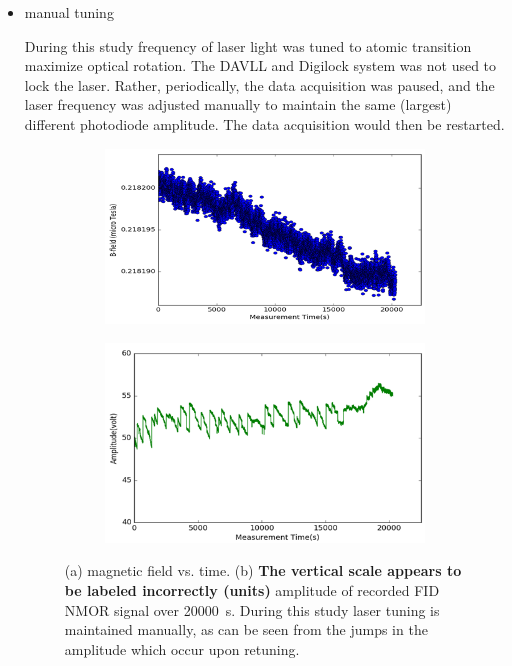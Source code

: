 \begin{itemize}
  {\bf If there is any other data that would substantiate your
    statements, please present it.}
  
\item manual tuning

During this study frequency of laser light was tuned to atomic
transition maximize optical rotation. The DAVLL and Digilock system
was not used to lock the laser.  Rather, periodically, the data
acquisition was paused, and the laser frequency was adjusted manually
to maintain the same (largest) different photodiode amplitude. The
data acquisition would then be restarted.

\begin{figure}
  \centering
  \begin{subfigure}[b]{0.45\textwidth}
    \centering
    \includegraphics[width=\textwidth]{figures/manual_tuning}
    \caption{}
    \label{fig:field-manual-tuning}
  \end{subfigure}
  \hfill
  \begin{subfigure}[b]{0.45\textwidth}
    \centering
    \includegraphics[width=\textwidth]{figures/amplitude_manual_tuning}
    \caption{}
    \label{fig:amplitude-manual-tuning}
  \end{subfigure}
  \caption{(a) magnetic field vs. time. (b) {\bf The vertical scale
      appears to be labeled incorrectly (units)} amplitude of recorded
    FID NMOR signal over 20000~s. During this study laser tuning is
    maintained manually, as can be seen from the jumps in the
    amplitude which occur upon retuning.}
  \label{fig:manual-tuning}
\end{figure}
   

\end{itemize}
